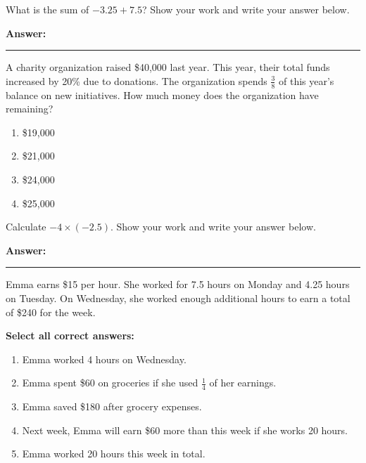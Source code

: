 \documentclass[12pt]{article}
\begin{document}
\begin{tcolorbox}[colframe=black!50, colback=white, title=\textbf{Problem 3 (7.NS.A.1)}]
What is the sum of \( -3.25 + 7.5 \)? Show your work and write your answer below.

\vspace{2cm}

\textbf{Answer:} \rule{0.5\textwidth}{0.4mm}
\end{tcolorbox}

\begin{tcolorbox}[colframe=black!50, colback=white, title=\textbf{Problem 4 (7.RP.A.3)}]
A charity organization raised \$40,000 last year. This year, their total funds increased by 20\% due to donations. The organization spends \(\frac{3}{8}\) of this year's balance on new initiatives. How much money does the organization have remaining?

\begin{enumerate}[label=(\Alph*)]
    \item \$19,000
    \item \$21,000
    \item \$24,000
    \item \$25,000
\end{enumerate}
\end{tcolorbox}

\begin{tcolorbox}[colframe=black!50, colback=white, title=\textbf{Problem 5 (7.NS.A.2)}]
Calculate \( -4 \times (-2.5) \). Show your work and write your answer below.

\vspace{3cm}

\textbf{Answer:} \rule{0.5\textwidth}{0.4mm}
\end{tcolorbox}

\begin{tcolorbox}[colframe=black!50, colback=white, title=\textbf{Problem 6 (7.EE.B.3)}]
Emma earns \$15 per hour. She worked for 7.5 hours on Monday and 4.25 hours on Tuesday. On Wednesday, she worked enough additional hours to earn a total of \$240 for the week.

\textbf{Select all correct answers:}
\begin{enumerate}[label=(\(\Box\))]
    \item Emma worked 4 hours on Wednesday.
    \item Emma spent \$60 on groceries if she used \(\frac{1}{4}\) of her earnings.
    \item Emma saved \$180 after grocery expenses.
    \item Next week, Emma will earn \$60 more than this week if she works 20 hours.
    \item Emma worked 20 hours this week in total.
\end{enumerate}
\vspace{2cm}
\end{tcolorbox}
\end{document}
